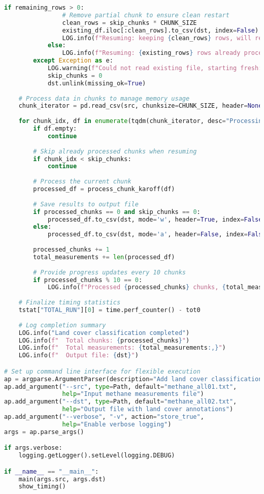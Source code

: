 \begin{lstlisting}[language=Python, caption=Land Cover Classification Addition Algorithm, label=alg:step02_add_lc]
            if remaining_rows > 0:
                # Remove partial chunk to ensure clean restart
                clean_rows = skip_chunks * CHUNK_SIZE
                existing_df.iloc[:clean_rows].to_csv(dst, index=False)
                LOG.info(f"Resuming: keeping {clean_rows} rows, will reprocess {remaining_rows} partial rows")
            else:
                LOG.info(f"Resuming: {existing_rows} rows already processed, skipping {skip_chunks} chunks")
        except Exception as e:
            LOG.warning(f"Could not read existing file, starting fresh: {e}")
            skip_chunks = 0
            dst.unlink(missing_ok=True)
    
    # Process data in chunks to manage memory usage
    chunk_iterator = pd.read_csv(src, chunksize=CHUNK_SIZE, header=None, names=headernames)
    
    for chunk_idx, df in enumerate(tqdm(chunk_iterator, desc="Processing chunks")):
        if df.empty:
            continue
            
        # Skip already processed chunks when resuming
        if chunk_idx < skip_chunks:
            continue
            
        # Process the current chunk
        processed_df = process_chunk_karoff(df)
        
        # Save results to output file
        if processed_chunks == 0 and skip_chunks == 0:
            processed_df.to_csv(dst, mode='w', header=True, index=False)
        else:
            processed_df.to_csv(dst, mode='a', header=False, index=False)
        
        processed_chunks += 1
        total_measurements += len(processed_df)
        
        # Provide progress updates every 10 chunks
        if processed_chunks % 10 == 0:
            LOG.info(f"Processed {processed_chunks} chunks, {total_measurements:,} measurements")
    
    # Finalize timing statistics
    tstat["TOTAL_RUN"][0] = time.perf_counter() - tot0
    
    # Log completion summary
    LOG.info("Land cover classification completed")
    LOG.info(f"  Total chunks: {processed_chunks}")
    LOG.info(f"  Total measurements: {total_measurements:,}")
    LOG.info(f"  Output file: {dst}")

# Set up command line interface for flexible execution
ap = argparse.ArgumentParser(description="Add land cover classification to methane data")
ap.add_argument("--src", type=Path, default="methane_all01.txt", 
                help="Input methane measurements file")
ap.add_argument("--dst", type=Path, default="methane_all02.txt",
                help="Output file with land cover annotations")
ap.add_argument("--verbose", "-v", action="store_true",
                help="Enable verbose logging")
args = ap.parse_args()

if args.verbose:
    logging.getLogger().setLevel(logging.DEBUG)

if __name__ == "__main__":
    main(args.src, args.dst)
    show_timing()
\end{lstlisting}

